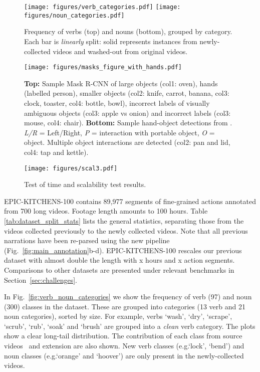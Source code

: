 \documentclass[twocolumn]{svjour3}          \smartqed
\makeatletter
\newcommand {\newDataset} {EPIC-KITCHENS-100}
\newcommand*{\eg}{e.g.\@\xspace}
\makeatother
\begin{document}
\begin{figure*}[t]
    \centering
    \texttt{[image: figures/verb\_categories.pdf]}
    \texttt{[image: figures/noun\_categories.pdf]}
    \caption{Frequency of verbs (top) and nouns (bottom), grouped by category. Each bar is \textit{linearly} split: solid represents instances from newly-collected videos and washed-out from original videos.}
    \label{fig:verb_noun_categories}
    \texttt{[image: figures/masks\_figure\_with\_hands.pdf]}
    \caption{\textbf{Top:} Sample Mask R-CNN of large objects (col1: oven), hands (labelled person), smaller objects (col2: knife, carrot, banana, col3: clock, toaster, col4: bottle, bowl), incorrect labels of visually ambiguous objects (col3: apple vs onion) and incorrect labels (col3: mouse, col4: chair).
    \textbf{Bottom:} Sample hand-object detections from \cite{Shan2020Understanding}. \textit{L/R} = Left/Right, \textit{P} = interaction with portable object, \textit{O} = object. Multiple object interactions are detected (col2: pan and lid, col4: tap and kettle).}
    \label{fig:masks}
\end{figure*}

\begin{figure*}[t]
    \begin{center}
    \texttt{[image: figures/scal3.pdf]}
    \caption{Test of time and scalability test results.}
    \label{fig:scalability}
    \end{center}
\end{figure*}

\newDataset{} contains 89,977 segments of fine-grained actions annotated from 700 long videos. 
Footage length amounts to 100 hours. 
Table \ref{tab:dataset_split_stats} lists the general statistics, separating those from the videos collected previously to the newly collected videos. Note that all previous narrations have been re-parsed using the new pipeline (Fig.~\ref{fig:main_annotation}b-d).
\newDataset{} rescales our previous dataset with almost double the length with x hours and x action segments. Comparisons to other datasets are presented under relevant benchmarks in Section~\ref{sec:challenges}.

In Fig.~\ref{fig:verb_noun_categories} we show the frequency of verb (97) and noun (300) classes in the dataset.
These are grouped into categories (13 verb and 21 noun categories), sorted by size. 
For example, verbs `wash', `dry', `scrape', `scrub', `rub', `soak' and `brush' are grouped into a \textit{clean} verb category. 
The plots show a clear long-tail distribution.
The contribution of each class from source videos~\cite{Damen2018EPICKITCHENS} and extension are also shown. 
New verb classes (\eg `lock', `bend') and noun classes (\eg `orange' and `hoover') are only present in the newly-collected videos.
\end{document}
